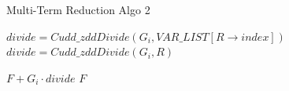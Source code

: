 \documentclass{article}
\theoremstyle{definition}
\begin{document}
\begin{algorithm}
\caption{Multi-Term Reduction Algo 2}
\label{multimon2}
\begin{algorithmic}[1]
\State $divide = Cudd\_zddDivide(G_i,VAR\_LIST[R \rightarrow index])$
\Else
\State $divide = Cudd\_zddDivide(G_i,R)$
\EndIf

\State \Return $F + G_i\cdot divide$
\Else
\State \Return $F$
\EndIf


\EndProcedure
\end{algorithmic}
\end{algorithm}


\end{document}
